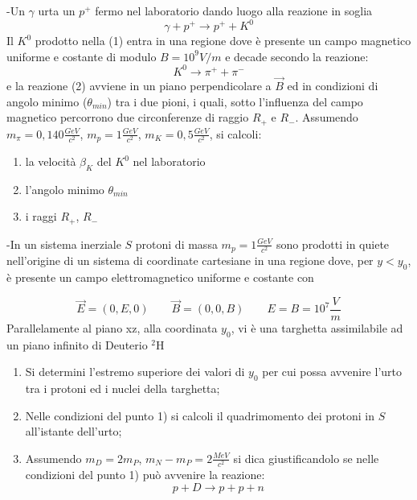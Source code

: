 \documentclass[12pt,twoside,a4]{article}
\begin{document}
\begin{esercizio}
	-Un $\gamma$ urta un $p^+$ fermo nel laboratorio dando luogo alla reazione in soglia 
	\begin{equation*}
		\gamma + p^+ \rightarrow p^+ +K^0
	\end{equation*}
Il $K^0$ prodotto nella (1) entra in una regione dove è presente un campo magnetico uniforme e costante di modulo $B = 10^9V/m$ e decade secondo la reazione:
\begin{equation*}
	K^0 \rightarrow \pi^+ + \pi^-
\end{equation*}
e la reazione (2) avviene in un piano perpendicolare a $\vec B$ ed in condizioni di angolo minimo ($\theta_{min}$) tra i due pioni, i quali, sotto l'influenza del campo magnetico percorrono due circonferenze di raggio $R_+$ e $R_-$. Assumendo $m_\pi=0,140 \frac{GeV}{c^2}$, $m_p=1 \frac{GeV}{c^2}$, $m_K=0,5 \frac{GeV}{c^2}$, si calcoli:
\begin{enumerate}[label=(\textit{\roman*})]
	\item la velocità $\beta_K$ del $K^0$ nel laboratorio
	\item l'angolo minimo $\theta_{min}$
	\item i raggi $R_+$, $R_-$ 
\end{enumerate}
\end{esercizio}

\begin{esercizio}
	-In un sistema inerziale $S$ protoni di massa $m_p = 1\frac{GeV}{c^2}$ sono prodotti in quiete nell'origine di un sistema di coordinate cartesiane in una regione dove, per $y < y_0$, è presente un campo elettromagnetico uniforme e costante con
	
	\begin{equation} 
		\vec E =(0,E,0) \qquad \vec B = (0,0,B) \qquad E=B=10^7 \frac{V}{m}
	\end{equation}
Parallelamente al piano xz, alla coordinata $y_0$, vi è una targhetta assimilabile ad un piano infinito di Deuterio $\mathrm{^2H}$
\begin{enumerate}[label=(\textit{\roman*})]
	\item Si determini l'estremo superiore dei valori di $y_0$ per cui possa avvenire l'urto tra i protoni ed i nuclei della targhetta;
	\item Nelle condizioni del punto 1) si calcoli il quadrimomento dei protoni in $S$ all'istante dell'urto;
	\item Assumendo $m_D=2m_P$, $m_N-m_P=2 \frac{MeV}{c^2}$ si dica giustificandolo se nelle condizioni del punto 1) può avvenire la reazione:
	\begin{equation}
	p + D \rightarrow p +p +n	
	\end{equation}
\end{enumerate}
\end{esercizio}
\end{document}
